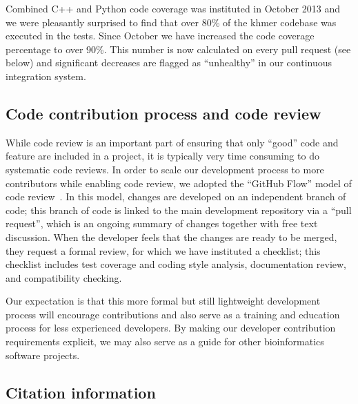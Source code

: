 \documentclass[12pt]{article}
\begin{document}

Combined C++ and Python code coverage was instituted in October 2013
and we were pleasantly surprised to find that over 80\% of the khmer
codebase was executed in the tests.  Since October we have increased
the code coverage percentage to over 90\%. This number is now
calculated on every pull request (see below) and significant decreases
are flagged as ``unhealthy'' in our continuous integration system.


\subsection{Code contribution process and code review}

While code review is an important part of ensuring that only ``good''
code and feature are included in a project, it is typically very time
consuming to do systematic code reviews.  In order to scale our
development process to more contributors while enabling code review,
we adopted the ``GitHub Flow'' model of code review~\cite{GitHubFlow}.
In this model, changes are developed on an independent branch
of code; this branch of code is linked to the main development
repository via a ``pull request'', which is an ongoing summary of
changes together with free text discussion.  When the developer feels
that the changes are ready to be merged, they request a formal review,
for which we have instituted a checklist; this checklist includes test
coverage and coding style analysis, documentation review, and
compatibility checking.

Our expectation is that this more formal but still lightweight
development process will encourage contributions and also serve as a
training and education process for less experienced developers.  By
making our developer contribution requirements explicit, we may also
serve as a guide for other bioinformatics software projects.



\subsection{Citation information}
\end{document}
